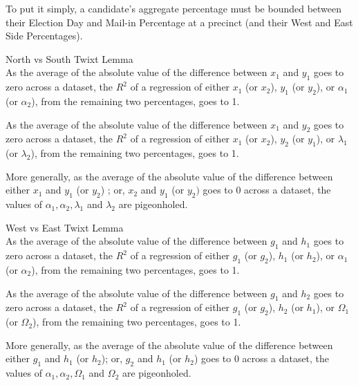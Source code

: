 To put it simply, a candidate's aggregate percentage must be bounded between their Election Day and Mail-in Percentage at a precinct (and their West and East Side Percentages).
\begin{corollary}{North vs South Twixt Lemma}\\
As the average of the absolute value of the difference between $x_{1}$ and $y_{1}$ goes to zero across a dataset, the $R^2$ of a regression of either $x_{1}$ (or $x_{2}$), $y_{1}$ (or $y_{2}$), or $\alpha_{1}$ (or $\alpha_{2}$), from the remaining two percentages, goes to 1.

As the average of the absolute value of the difference between $x_{1}$ and $y_{2}$ goes to zero across a dataset, the $R^2$ of a regression of either $x_{1}$ (or $x_{2}$), $y_{2}$ (or $y_{1}$), or $\lambda_{1}$ (or $\lambda_{2}$), from the remaining two percentages, goes to 1.

More generally, as the average of the absolute value of the difference between either $x_{1}$ and $y_{1}$ (or $y_{2}$) ; or, $x_{2}$ and $y_{1}$ (or $y_{2})$ goes to 0 across a dataset, the values of $\alpha_{1},\alpha_{2}, \lambda_{1}$ and $\lambda_{2}$ are pigeonholed.
\end{corollary}
\begin{corollary}{West vs East Twixt Lemma}\\
As the average of the absolute value of the difference between $g_{1}$ and $h_{1}$ goes to zero across a dataset, the $R^2$ of a regression of either $g_{1}$ (or $g_{2}$), $h_{1}$ (or $h_{2}$), or $\alpha_{1}$ (or $\alpha_{2}$), from the remaining two percentages, goes to 1.

As the average of the absolute value of the difference between $g_{1}$ and $h_{2}$ goes to zero across a dataset, the $R^2$ of a regression of either $g_{1}$ (or $g_{2}$), $h_{2}$ (or $h_{1}$), or $\Omega_{1}$ (or $\Omega_{2}$), from the remaining two percentages, goes to 1.

More generally, as the average of the absolute value of the difference between either $g_{1}$ and $h_{1}$ (or $h_{2}$); or, $g_{2}$ and $h_{1}$ (or $h_{2}$) goes to 0 across a dataset, the values of $\alpha_{1},\alpha_{2}, \Omega_{1}$ and $\Omega_{2}$ are pigeonholed.
\end{corollary}
